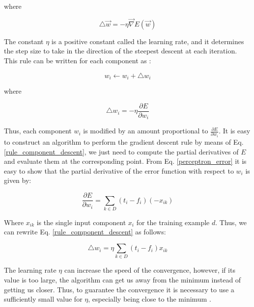 where

\begin{equation}
\label{update_rule_gradient_descent}
	 \triangle \vec{w} = -\eta \vec{\nabla} E(\vec{w})
\end{equation}

The constant $\eta$ is a positive constant called the learning rate, and it determines the step size to take in the direction of the steepest descent at each iteration. This rule can be written for each component as \cite{machine_mitchell}:

\begin{equation}
	w_{i} \leftarrow w_{i} + \triangle w_{i}
\end{equation}

where

\begin{equation}
\label{rule_component_descent}
	 \triangle w_{i} = -\eta \frac{\partial E}{\partial w_{i}} 
\end{equation}

Thus, each component $w_{i}$ is modified by an amount proportional to $\frac{\partial E}{\partial w_{i}} $. It is easy to construct an algorithm to perform the gradient descent rule by means of Eq. \ref{rule_component_descent}, we just need to compute the partial derivatives of $E$ and evaluate them at the corresponding point. From Eq. \ref{perceptron_error} it is easy to show that the partial derivative of the error function with respect to $w_{i}$ is given by:

\begin{equation}
	 \frac{\partial E}{\partial w_{i}} = \sum_{k \in D} (t_{i}-f_{i})(-x_{ik})
\end{equation}

Where $x_{ik}$ is the single input component $x_{i}$ for the training example $d$. Thus, we can rewrite Eq. \ref{rule_component_descent} as follows:

\begin{equation}
\label{rule_gradient_descent}
	 \triangle w_{i} = \eta \sum_{k \in D} (t_{i}-f_{i})x_{ik}
\end{equation}

The learning rate $\eta$ can increase the speed of the convergence, however, if its value is too large, the algorithm can get us away from the minimum instead of getting us closer. Thus, to guarantee the convergence it is necessary to use a sufficiently small value for $\eta$, especially being close to the minimum \cite{machine_mitchell}.\\

